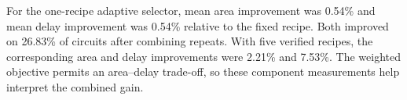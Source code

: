 For the one-recipe adaptive selector, mean area improvement was 0.54\% and mean delay improvement was 0.54\% relative to the fixed recipe. Both improved on 26.83\% of circuits after combining repeats. With five verified recipes, the corresponding area and delay improvements were 2.21\% and 7.53\%. The weighted objective permits an area--delay trade-off, so these component measurements help interpret the combined gain.

